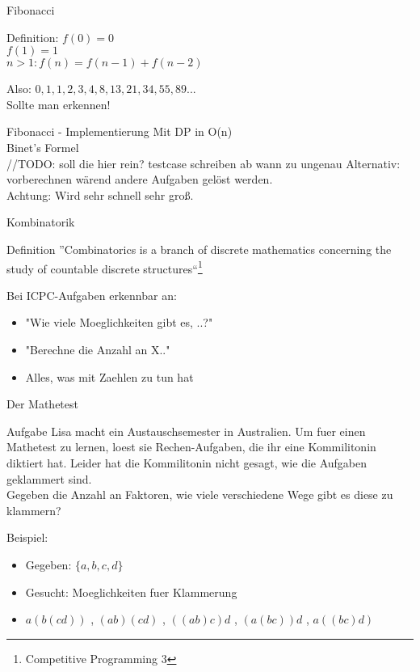 \documentclass[18pt]{beamer}
\begin{document}
\begin{frame}{Fibonacci}
\begin{block}{Definition:}
\(f(0)=0\)\\
\(f(1)=1\)\\
\(n>1: f(n)=f(n-1)+f(n-2)\)\\
\end{block}
Also: \(0, 1, 1, 2, 3, 4, 8, 13, 21, 34, 55, 89...\)\\

Sollte man erkennen!
\end{frame}


\begin{frame}{Fibonacci - Implementierung}
Mit DP in O(n)\\
Binet's Formel\\ //TODO: soll die hier rein? testcase schreiben ab wann zu ungenau
Alternativ: vorberechnen wärend andere Aufgaben gelöst werden.\\
Achtung: Wird sehr schnell sehr groß.

\end{frame}

\begin{frame}{Kombinatorik}
\begin{block}{Definition}
''Combinatorics is a branch of discrete mathematics concerning the study of countable discrete structures``\footnote{Competitive Programming 3}
\end{block}
\pause
Bei ICPC-Aufgaben erkennbar an:
\begin{itemize}
\item "Wie viele Moeglichkeiten gibt es, ..?"
\item "Berechne die Anzahl an X.."
\item Alles, was mit Zaehlen zu tun hat
\end{itemize}
\end{frame}

\begin{frame}{Der Mathetest}
\begin{block}{Aufgabe}
Lisa macht ein Austauschsemester in Australien. Um fuer einen Mathetest zu lernen, loest sie Rechen-Aufgaben, die ihr eine Kommilitonin diktiert hat. Leider hat die Kommilitonin nicht gesagt, wie die Aufgaben geklammert sind. \\
Gegeben die Anzahl an Faktoren, wie viele verschiedene Wege gibt es diese zu klammern?
\end{block}
\pause
Beispiel:
\begin{itemize}
\item Gegeben: $\lbrace a, b, c, d \rbrace$
\item Gesucht: Moeglichkeiten fuer Klammerung
\item $ a \left( b \left( c d \right) \right) $ , $\left( a b \right) \left( c d \right) $ , $\left( \left( a b \right) c \right) d$ , $\left( a \left( b  c \right) \right) d $ , $ a \left( \left( b  c \right) d \right) $
\end{itemize}
\end{frame}
\end{document}
